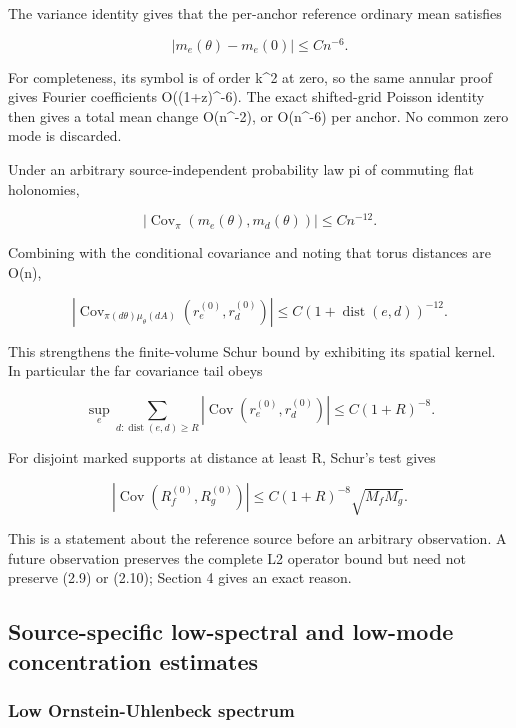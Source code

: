 \documentclass[
  11pt,
]{article}
\begin{document}
The variance identity gives that the per-anchor reference ordinary mean satisfies

\[
 |m_e(\theta)-m_e(0)|\le Cn^{-6}.
\tag{2.8}
\]

For completeness, its symbol is of order \textbar k\textbar\^{}2 at
zero, so the same annular proof gives Fourier coefficients
O((1+\textbar z\textbar)\^{}-6). The exact shifted-grid Poisson identity
then gives a total mean change O(n\^{}-2), or O(n\^{}-6) per anchor. No
common zero mode is discarded.

Under an arbitrary source-independent probability law pi of commuting
flat holonomies,

\[
 |\operatorname{Cov}_{\pi}(m_e(\theta),m_d(\theta))|
 \le Cn^{-12}.
\]

Combining with the conditional covariance and noting that torus
distances are O(n),

\[
 \boxed{\quad
 |\operatorname{Cov}_{\pi(d\theta)\mu_\theta(dA)}
        (r_e^{(0)},r_d^{(0)})|
 \le C(1+\operatorname{dist}(e,d))^{-12}.
 \quad}
\tag{2.9}
\]

This strengthens the finite-volume Schur bound by exhibiting its spatial
kernel. In particular the far covariance tail obeys

\[
 \sup_e\sum_{d:\operatorname{dist}(e,d)\ge R}
 |\operatorname{Cov}(r_e^{(0)},r_d^{(0)})|
 \le C(1+R)^{-8}.
\tag{2.10}
\]

For disjoint marked supports at distance at least R, Schur's test gives

\[
 |\operatorname{Cov}(R_f^{(0)},R_g^{(0)})|
 \le C(1+R)^{-8}\sqrt{M_fM_g}.
\tag{2.11}
\]

This is a statement about the reference source before an arbitrary
observation. A future observation preserves the complete L2 operator
bound but need not preserve (2.9) or (2.10); Section 4 gives an exact
reason.

\hypertarget{source-specific-low-spectral-and-low-mode-concentration-estimates}{%
\subsection{Source-specific low-spectral and low-mode concentration
estimates}\label{source-specific-low-spectral-and-low-mode-concentration-estimates}}

\hypertarget{low-ornstein-uhlenbeck-spectrum}{%
\subsubsection{Low Ornstein-Uhlenbeck
spectrum}\label{low-ornstein-uhlenbeck-spectrum}}
\end{document}
